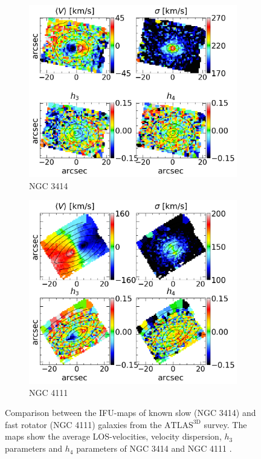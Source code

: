 \documentclass[english, oneside]{HYgradu}
\begin{document}
\begin{figure}
	\centering
	\begin{subfigure}[b]{0.49\textwidth}
		\includegraphics[width=\textwidth]{NGC3414_r6_voronoi.png}
		\caption{NGC 3414}
	\end{subfigure}
	\begin{subfigure}[b]{0.49\textwidth}
		\includegraphics[width=\textwidth]{NGC4111_r1_voronoi.png}
		\caption{NGC 4111}
	\end{subfigure}
	\caption{Comparison between the IFU-maps of known slow (NGC 3414) and fast rotator (NGC 4111) galaxies from the $\mathrm{ATLAS^{3D}}$ survey. The maps show the average LOS-velocities, velocity dispersion, $h_3$ parameters and $h_4$ parameters of NGC 3414 \citep{Emsellem2004} and NGC 4111 \citep{Cappellari2011}.}
	\label{figure:obs_IFU}
\end{figure}
\end{document}
